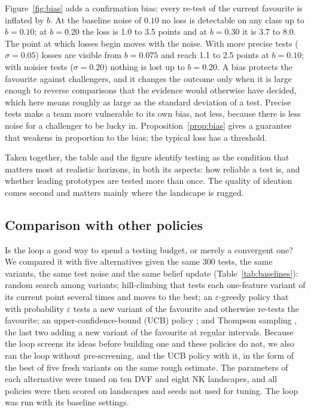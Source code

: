 \documentclass[10pt,twocolumn]{article}
\theoremstyle{definition}
\begin{document}
Figure~\ref{fig:bias} adds a confirmation bias: every re-test of the current favourite is inflated by $b$. At the baseline noise of $0.10$ no loss is detectable on any class up to $b=0.10$; at $b=0.20$ the loss is 1.0 to 3.5 points and at $b=0.30$ it is 3.7 to 8.0. The point at which losses begin moves with the noise. With more precise tests ($\sigma=0.05$) losses are visible from $b=0.075$ and reach 1.1 to 2.5 points at $b=0.10$; with noisier tests ($\sigma=0.20$) nothing is lost up to $b=0.20$. A bias protects the favourite against challengers, and it changes the outcome only when it is large enough to reverse comparisons that the evidence would otherwise have decided, which here means roughly as large as the standard deviation of a test. Precise tests make a team more vulnerable to its own bias, not less, because there is less noise for a challenger to be lucky in. Proposition~\ref{prop:bias} gives a guarantee that weakens in proportion to the bias; the typical loss has a threshold.

Taken together, the table and the figure identify testing as the condition that matters most at realistic horizons, in both its aspects: how reliable a test is, and whether leading prototypes are tested more than once. The quality of ideation comes second and matters mainly where the landscape is rugged.

\subsection{Comparison with other policies}
\label{sec:baselines}

Is the loop a good way to spend a testing budget, or merely a convergent one? We compared it with five alternatives given the same 300 tests, the same variants, the same test noise and the same belief update (Table~\ref{tab:baselines}): random search among variants; hill-climbing that tests each one-feature variant of its current point several times and moves to the best; an $\varepsilon$-greedy policy that with probability $\varepsilon$ tests a new variant of the favourite and otherwise re-tests the favourite; an upper-confidence-bound (UCB) policy \citep{auer2002}; and Thompson sampling \citep{russo2018}, the last two adding a new variant of the favourite at regular intervals. Because the loop screens its ideas before building one and these policies do not, we also ran the loop without pre-screening, and the UCB policy with it, in the form of the best of five fresh variants on the same rough estimate. The parameters of each alternative were tuned on ten DVF and eight NK landscapes, and all policies were then scored on landscapes and seeds not used for tuning. The loop was run with its baseline settings.
\end{document}
